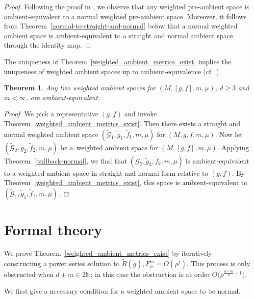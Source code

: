 \documentclass[pdftex]{sigma}
\numberwithin{equation}{section}
\newtheorem{Theorem}{Theorem}[section]
\begin{document}
\begin{proof}
Following the proof in \cite[Proposition 2.8]{FeffermanGraham2012}, we observe that any weighted pre-ambient space is ambient-equivalent to a normal weighted pre-ambient space. Moreover, it follows from Theorem~\ref{normal-to-straight-and-normal} below that a normal weighted ambient space is ambient-equivalent to a straight and normal ambient space through the identity map.
\end{proof}

The uniqueness of Theorem~\ref{weighted_ambient_metrics_exist} implies the uniqueness of weighted ambient spaces up to ambient-equivalence (cf.\ \cite[Theorem~2.9]{FeffermanGraham2012}).

\begin{Theorem}
Any two weighted ambient spaces for $(M,[g,f],m,\mu)$, $d\geq 3$ and $m<\infty$, are ambient-equivalent.
\end{Theorem}

{\sloppy\begin{proof}
We pick a representative $(g,f)$ and invoke Theorem~\ref{weighted_ambient_metrics_exist}. Then there exists a straight and normal weighted ambient space $(\widetilde{\mathcal{G}}_1,\widetilde{g}_1,\widetilde{f}_1,m,\mu)$ for $(M,g,f,m,\mu)$. Now let $(\widetilde{\mathcal{G}}_2,\widetilde{g}_2,\widetilde{f}_2,m,\mu)$ be a~weighted ambient space for $(M,[g,f],m,\mu)$. Applying Theorem~\ref{pullback-normal}, we find that $(\widetilde{\mathcal{G}}_2, \widetilde{g}_2,\widetilde{f}_2,m,\mu)$ is ambient-equivalent to a weighted ambient space in straight and normal form relative to $(g,f)$. By Theorem~\ref{weighted_ambient_metrics_exist}, this space is ambient-equivalent to $(\widetilde{\mathcal{G}}_1,\widetilde{g}_1,\widetilde{f}_1,m,\mu)$.
\end{proof}}

\section{Formal theory}\label{formal-theory}

We prove Theorem~\ref{weighted_ambient_metrics_exist} by iteratively constructing a power series solution to $\widetilde{R}(\widetilde{g}),\widetilde{F_\phi^m}=O(\rho^j)$. This process is only obstructed when $d+m\in 2\mathbb{N}$; in this case the obstruction is at order $O\big(\rho^{\frac{d+m}{2}-1}\big)$.

We first give a necessary condition for a weighted ambient space to be normal.
\end{document}
